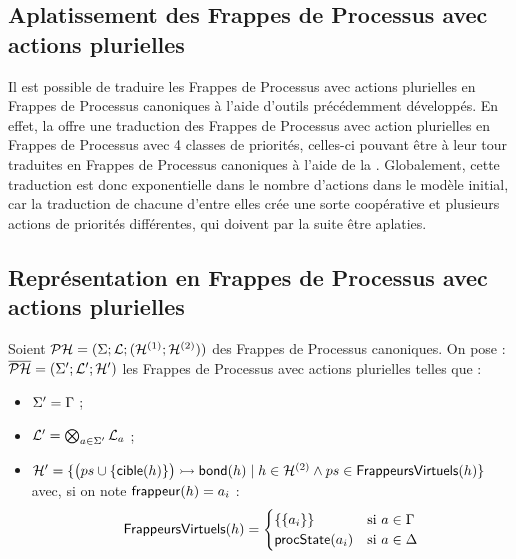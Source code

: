 \subsection{Aplatissement des Frappes de Processus avec actions plurielles}

Il est possible de traduire les Frappes de Processus avec actions plurielles
en Frappes de Processus canoniques à l'aide d'outils précédemment développés.
En effet, la  offre une traduction des Frappes de Processus avec action plurielles
en Frappes de Processus avec 4 classes de priorités, celles-ci pouvant être à leur tour traduites
en Frappes de Processus canoniques à l'aide de la .
Globalement, cette traduction est donc exponentielle dans le nombre d'actions dans le modèle
initial, car la traduction de chacune d'entre elles crée une sorte coopérative et plusieurs
actions de priorités différentes, qui doivent par la suite être aplaties.



\subsection{Représentation en Frappes de Processus avec actions plurielles}

\TODO

\begin{definition}
  Soient $\mathcal{PH} = (\Sigma; \mathcal{L}; (\mathcal{H}^{(1)}; \mathcal{H}^{(2)}))$ des Frappes de Processus canoniques.
  On pose : $\overline{\mathcal{PH}} = (\Sigma'; \mathcal{L}'; \mathcal{H}')$ les Frappes de Processus avec actions plurielles
  telles que :
  \begin{itemize}
    \item $\Sigma' = \Gamma$ ;
    \item $\mathcal{L}' = \bigotimes_{a \in \Sigma'} \mathcal{L}_a$ ;
    \item $\mathcal{H}' = \{ \mbox{$\big( ps \cup \{ \mathsf{cible}(h) \} \big) \rightarrowtail \mathsf{bond}(h)$}
      \mid h \in \mathcal{H}^{(2)} \wedge ps \in \mathsf{FrappeursVirtuels}(h) \}$
    avec, si on note $\mathsf{frappeur}(h) = a_i$ :
    \[\mathsf{FrappeursVirtuels}(h) =
      \begin{cases}
        \{ \{ a_i \} \} & \text{si } a \in \Gamma \\
        \mathsf{procState}(a_i) & \text{si } a \in \Delta
      \end{cases}\]
  \end{itemize}
\end{definition}

